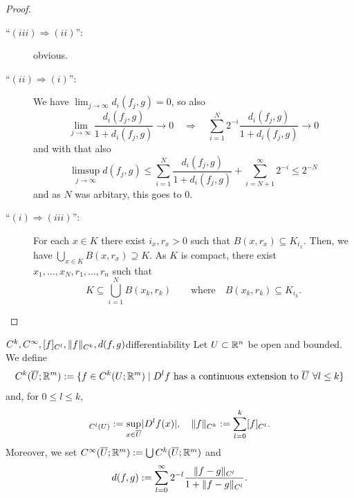 \documentclass[language=english]{../../Template/TemplateLecture}
\begin{document}
\begin{proof}
    \begin{description}
        \item[\enquote{$(iii) \Rightarrow (ii)$}:] obvious.
        \item[\enquote{$(ii) \Rightarrow (i)$}:] We have $\lim_{j \to \infty} d_i(f_j, g) = 0$, so also 
        \begin{equation}
            \lim_{j \to \infty} \frac{d_i(f_j, g)}{1 + d_i(f_j, g)} \to 0 \quad \Rightarrow \quad \sum_{i = 1}^N 2^{-i} \frac{d_i(f_j, g)}{1 + d_i(f_j, g)} \to 0
        \end{equation}
        and with that also 
        \begin{equation}
            \limsup_{j \to \infty} d(f_j, g) \leq \sum_{i = 1}^N \frac{d_i(f_j, g)}{1 + d_i(f_j, g)} + \sum_{i = N + 1}^\infty 2^{-i} \leq 2^{-N}
        \end{equation}
        and as $N$ was arbitary, this goes to $0$.
        \item[\enquote{$(i) \Rightarrow (iii)$}:] For each $x \in K$ there exist $i_x, r_x > 0$ such that $B(x, r_x) \subseteq K_{i_x}$. Then, we have $\bigcup_{x \in K} B(x, r_x) \supseteq K$. As $K$ is compact, there exist $x_1, \ldots, x_N, r_1, \ldots, r_n$ such that 
        \begin{equation}
            K \subseteq \bigcup_{i = 1}^N B(x_k, r_k) \quad \quad \text{where} \quad B(x_k, r_k) \subseteq K_{i_k}. 
        \end{equation}
    \end{description}
\end{proof}




\begin{defi}{$C^k, C^\infty, [f]_{C^l}, \lVert f\rVert_{C^k}, d(f,g)$}{differentiability}
    Let $U \subset \mathbb{R}^n$ be open and bounded. We define 
    \begin{equation}
        C^k(\overline{U}; \mathbb{R}^m) := \{f \in C^k(U; \mathbb{R}^m) \mid D^l f \text{ has a continuous extension to } \overline{U}~\forall l \leq k\}
    \end{equation}
    and, for $0 \leq l \leq k$,
    \begin{equation}
        [f]_{C^l(U)} := \sup_{x \in \overline{U}}\abs{D^l f(x)}, \quad \norm{f}_{C^k} := \sum_{l = 0}^k [f]_{C^l}.
    \end{equation}
    Moreover, we set $C^\infty(\overline{U};\mathbb{R}^m) := \bigcup C^k(\overline{U};\mathbb{R}^m)$ and
    \begin{equation}
        d(f,g) := \sum_{l = 0}^\infty 2^{-l} \frac{\lVert f-g\rVert_{C^l}}{1 + \lVert f-g\rVert_{C^l}}.
    \end{equation}
\end{defi}
\end{document}

